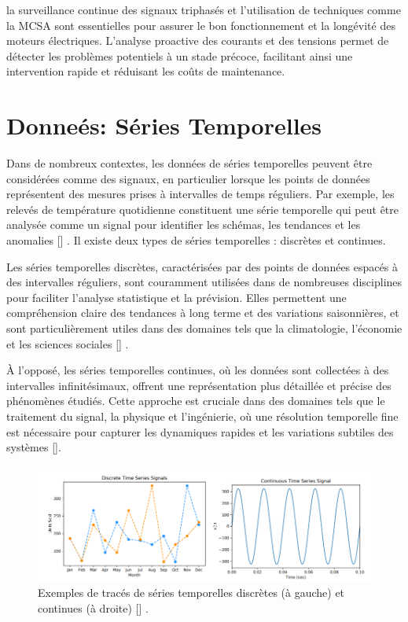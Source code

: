 la surveillance continue des signaux triphasés et l'utilisation de techniques
comme la MCSA sont essentielles pour assurer le bon fonctionnement et la
longévité des moteurs électriques. L'analyse proactive des courants et des
tensions permet de détecter les problèmes potentiels à un stade précoce,
facilitant ainsi une intervention rapide et réduisant les coûts de maintenance.

\section{Donneés: Séries Temporelles}

Dans de nombreux contextes, les données de séries temporelles peuvent être
considérées comme des signaux, en particulier lorsque les points de données
représentent des mesures prises à intervalles de temps réguliers. Par exemple,
les relevés de température quotidienne constituent une série temporelle qui
peut être analysée comme un signal pour identifier les schémas, les tendances
et les anomalies [\cite{brophy2023gan}] . Il existe deux types de séries
temporelles : discrètes et continues.

Les séries temporelles discrètes, caractérisées par des points de données
espacés à des intervalles réguliers, sont couramment utilisées dans de
nombreuses disciplines pour faciliter l'analyse statistique et la prévision.
Elles permettent une compréhension claire des tendances à long terme et des
variations saisonnières, et sont particulièrement utiles dans des domaines tels
que la climatologie, l'économie et les sciences sociales [\cite{brophy2023gan}]
.

À l'opposé, les séries temporelles continues, où les données sont collectées à des
intervalles infinitésimaux, offrent une représentation plus détaillée et précise des
phénomènes étudiés. Cette approche est cruciale dans des domaines tels que le traitement
du signal, la physique et l'ingénierie, où une résolution temporelle fine est nécessaire
pour capturer les dynamiques rapides et les variations subtiles des systèmes [\cite{brophy2023gan}].

\begin{figure}[hbt!]
	\centering
	\includegraphics[width=12cm]{images_pfe/timeseries.png}
	\caption{
		Exemples de tracés de séries temporelles discrètes (à gauche) et continues (à droite) [\cite{brophy2023gan}] .}
	\label{fig:time-series}
\end{figure}
\FloatBarrier

